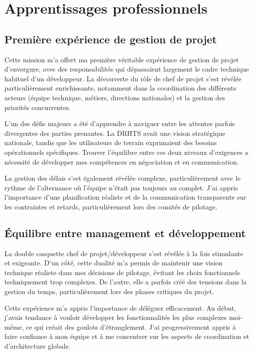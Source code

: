 \section{Apprentissages professionnels}

\subsection{Première expérience de gestion de projet}
Cette mission m'a offert ma première véritable expérience de gestion de projet d'envergure, avec des responsabilités qui dépassaient largement le cadre technique habituel d'un développeur.
La découverte du rôle de chef de projet s'est révélée particulièrement enrichissante, notamment dans la coordination des différents acteurs (équipe technique, métiers, directions nationales) et la gestion des priorités concurrentes.

L'un des défis majeurs a été d'apprendre à naviguer entre les attentes parfois divergentes des parties prenantes.
La DRHTS avait une vision stratégique nationale, tandis que les utilisateurs de terrain exprimaient des besoins opérationnels spécifiques.
Trouver l'équilibre entre ces deux niveaux d'exigences a nécessité de développer mes compétences en négociation et en communication.

La gestion des délais s'est également révélée complexe, particulièrement avec le rythme de l'alternance où l'équipe n'était pas toujours au complet.
J'ai appris l'importance d'une planification réaliste et de la communication transparente sur les contraintes et retards, particulièrement lors des comités de pilotage.

\subsection{Équilibre entre management et développement}
La double casquette chef de projet/développeur s'est révélée à la fois stimulante et exigeante.
D'un côté, cette dualité m'a permis de maintenir une vision technique réaliste dans mes décisions de pilotage, évitant les choix fonctionnels techniquement trop complexes.
De l'autre, elle a parfois créé des tensions dans la gestion du temps, particulièrement lors des phases critiques du projet.

Cette expérience m'a appris l'importance de déléguer efficacement.
Au début, j'avais tendance à vouloir développer les fonctionnalités les plus complexes moi-même, ce qui créait des goulots d'étranglement.
J'ai progressivement appris à faire confiance à mon équipe et à me concentrer sur les aspects de coordination et d'architecture globale.


